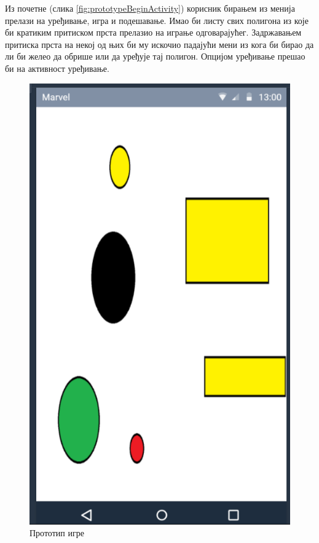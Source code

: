  Из почетне (слика \ref{fig:prototypeBeginActivity}) корисник бирањем из менија прелази на уређивање, игра и подешавање. Имао би листу свих полигона из које би кратиким притиском прста прелазио на играње одговарајућег. Задржавањем притиска прста на некој од њих би му искочио падајући мени из кога би бирао да ли би желео да обрише или да уређује тај полигон. Опцијом уређивање прешао би на активност уређивање. 

\begin{figure}[htb!]
\begin{center}
\includegraphics[scale=.5]{pictures/prototype/gameActivity}
\caption{Прототип игре}\label{fig:prototypeGameActivity}
\end{center}
\end{figure}

